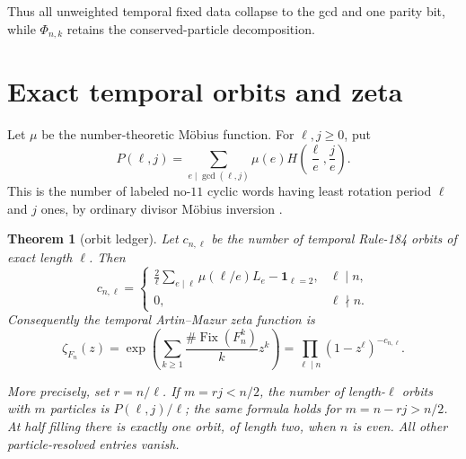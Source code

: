 \documentclass[11pt,a4paper]{amsart}
\newtheorem{theorem}{Theorem}[section]
\theoremstyle{definition}
\theoremstyle{remark}
\newcommand{\Fix}{\operatorname{Fix}}
\newcommand{\1}{\mathbf 1}
\begin{document}
Thus all unweighted temporal fixed data collapse to the gcd and one parity
bit, while $\Phi_{n,k}$ retains the conserved-particle decomposition.

\section{Exact temporal orbits and zeta}

Let $\mu$ be the number-theoretic M\"obius function.  For $\ell,j\geq0$, put
\begin{equation}\label{eq:primitiveH}
 P(\ell,j)=
 \sum_{e\mid\gcd(\ell,j)}\mu(e)
 H\left(\frac\ell e,\frac je\right).
\end{equation}
This is the number of labeled no-$11$ cyclic words having least rotation
period $\ell$ and $j$ ones, by ordinary divisor M\"obius inversion
\cite{Stanley2012}.

\begin{theorem}[orbit ledger]\label{thm:orbits}
Let $c_{n,\ell}$ be the number of temporal Rule-184 orbits of exact length
$\ell$.  Then
\begin{equation}\label{eq:orbitcount}
 c_{n,\ell}=
 \begin{cases}
 \displaystyle
 \frac2\ell\sum_{e\mid\ell}\mu(\ell/e)L_e-\1_{\ell=2},
 &\ell\mid n,\\[7pt]
 0,&\ell\nmid n.
 \end{cases}
\end{equation}
Consequently the temporal Artin--Mazur zeta function is
\begin{equation}\label{eq:zeta}
 \zeta_{F_n}(z)
 =\exp\!\left(\sum_{k\geq1}\frac{\#\Fix(F_n^k)}kz^k\right)
 =\prod_{\ell\mid n}(1-z^\ell)^{-c_{n,\ell}}.
\end{equation}

More precisely, set $r=n/\ell$.  If $m=rj<n/2$, the number of length-$\ell$
orbits with $m$ particles is $P(\ell,j)/\ell$; the same formula holds for
$m=n-rj>n/2$.  At half filling there is exactly one orbit, of length two,
when $n$ is even.  All other particle-resolved entries vanish.
\end{theorem}
\end{document}
